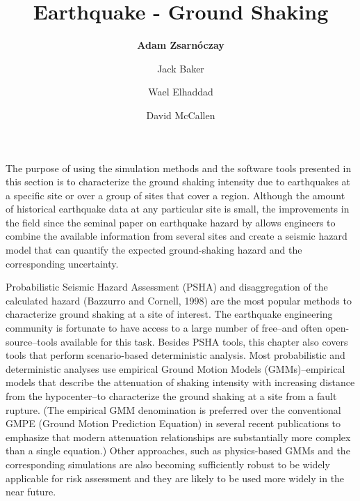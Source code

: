 %
%
%

\title{Earthquake - Ground Shaking}
\author{
    \textbf{Adam Zsarnóczay}
    \and Jack Baker 
    \and Wael Elhaddad
    \and David McCallen}
\tocauthor{}
%
%
\maketitle

The purpose of using the simulation methods and the software tools presented in this section is to characterize the ground shaking intensity due to earthquakes at a specific site or over a group of sites that cover a region. Although the amount of historical earthquake data at any particular site is small, the improvements in the field since the seminal paper on earthquake hazard by \cite{cornell1968engineering} allows engineers to combine the available information from several sites and create a seismic hazard model that can quantify the expected ground-shaking hazard and the corresponding uncertainty. 

Probabilistic Seismic Hazard Assessment (PSHA) and disaggregation of the calculated hazard (Bazzurro and Cornell, 1998) are the most popular methods to characterize ground shaking at a site of interest. The earthquake engineering community is fortunate to have access to a large number of free--and often open-source--tools available for this task. Besides PSHA tools, this chapter also covers tools that perform scenario-based deterministic analysis. Most probabilistic and deterministic analyses use empirical Ground Motion Models (GMMs)--empirical models that describe the attenuation of shaking intensity with increasing distance from the hypocenter--to characterize the ground shaking at a site from a fault rupture. (The empirical GMM denomination is preferred over the conventional GMPE (Ground Motion Prediction Equation) in several recent publications to emphasize that modern attenuation relationships are substantially more complex than a single equation.) Other approaches, such as physics-based GMMs and the corresponding simulations are also becoming sufficiently robust to be widely applicable for risk assessment and they are likely to be used more widely in the near future. 

